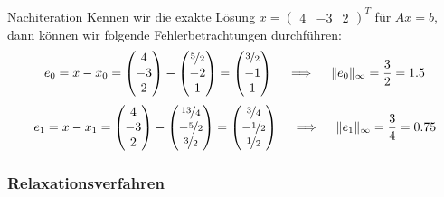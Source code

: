 \begin{example}{Nachiteration}
    Kennen wir die exakte Lösung $x = \begin{pmatrix} 4 & -3 & 2 \end{pmatrix}^T$ für $A x = b$, dann können wir folgende Fehlerbetrachtungen durchführen:
    \[
        e_0 = x - x_0 =
        \begin{pmatrix}
            4  \\
            -3 \\
            2
        \end{pmatrix}
        -
        \begin{pmatrix}
            \nicefrac{5}{2} \\
            -2              \\
            1
        \end{pmatrix}
        =
        \begin{pmatrix}
            \nicefrac{3}{2} \\
            -1              \\
            1
        \end{pmatrix}
        \quad \implies \quad
        \|e_0\|_\infty = \frac{3}{2} = 1.5
    \]
    \[
        e_1 = x - x_1 =
        \begin{pmatrix}
            4  \\
            -3 \\
            2
        \end{pmatrix}
        -
        \begin{pmatrix}
            \nicefrac{13}{4} \\
            -\nicefrac{5}{2} \\
            \nicefrac{3}{2}
        \end{pmatrix}
        =
        \begin{pmatrix}
            \nicefrac{3}{4}  \\
            -\nicefrac{1}{2} \\
            \nicefrac{1}{2}
        \end{pmatrix}
        \quad \implies \quad
        \|e_1\|_\infty = \frac{3}{4} = 0.75
    \]
\end{example}

\subsubsection{Relaxationsverfahren}

